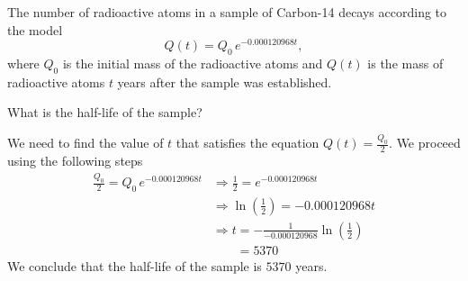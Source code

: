 \begin{pccexample}
	The number of radioactive atoms in a sample of Carbon-14 decays according to the model
	\[
		Q(t)= Q_0\,e^{-0.000120968t},
	\]
	where $Q_0$ is the initial mass of the radioactive atoms and $Q(t)$ is the mass of radioactive atoms $t$ years after the sample was established.
	
	What is the half-life of the sample?
	\begin{pccsolution}
		We need to find the value of $t$ that satisfies the equation $Q(t)=\frac{Q_0}{2}$. 
		We proceed using the following steps
		\begin{align*}
			\frac{Q_0}{2}=Q_0\,e^{-0.000120968t} & \Rightarrow \frac{1}{2}=e^{-0.000120968t}                            \\
			                                     & \Rightarrow \ln\left( \frac{1}{2} \right) = -0.000120968t            \\
			                                     & \Rightarrow t = -\frac{1}{-0.000120968}\ln\left( \frac{1}{2} \right) \\
			                                     & \phantom{ {}\Rightarrow t} = 5370                                    
		\end{align*}
		We conclude that the half-life of the sample is $5370$ years.
	\end{pccsolution}
\end{pccexample}

